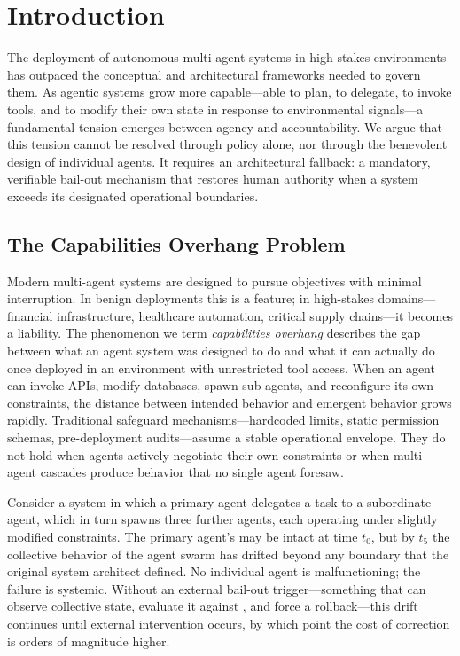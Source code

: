 \section{Introduction}

The deployment of autonomous multi-agent systems in high-stakes environments has outpaced the conceptual and architectural frameworks needed to govern them. As agentic systems grow more capable—able to plan, to delegate, to invoke tools, and to modify their own state in response to environmental signals—a fundamental tension emerges between agency and accountability. We argue that this tension cannot be resolved through policy alone, nor through the benevolent design of individual agents. It requires an architectural fallback: a mandatory, verifiable bail-out mechanism that restores human authority when a system exceeds its designated operational boundaries.

\subsection{The Capabilities Overhang Problem}

Modern multi-agent systems are designed to pursue objectives with minimal interruption. In benign deployments this is a feature; in high-stakes domains—financial infrastructure, healthcare automation, critical supply chains—it becomes a liability. The phenomenon we term \textit{capabilities overhang} describes the gap between what an agent system was designed to do and what it can actually do once deployed in an environment with unrestricted tool access. When an agent can invoke APIs, modify databases, spawn sub-agents, and reconfigure its own constraints, the distance between intended behavior and emergent behavior grows rapidly. Traditional safeguard mechanisms—hardcoded limits, static permission schemas, pre-deployment audits—assume a stable operational envelope. They do not hold when agents actively negotiate their own constraints or when multi-agent cascades produce behavior that no single agent foresaw.

Consider a system in which a primary agent delegates a task to a subordinate agent, which in turn spawns three further agents, each operating under slightly modified constraints. The primary agent's \purpose may be intact at time $t_0$, but by $t_5$ the collective behavior of the agent swarm has drifted beyond any boundary that the original system architect defined. No individual agent is malfunctioning; the failure is systemic. Without an external bail-out trigger—something that can observe collective state, evaluate it against \facts, and force a rollback—this drift continues until external intervention occurs, by which point the cost of correction is orders of magnitude higher.

